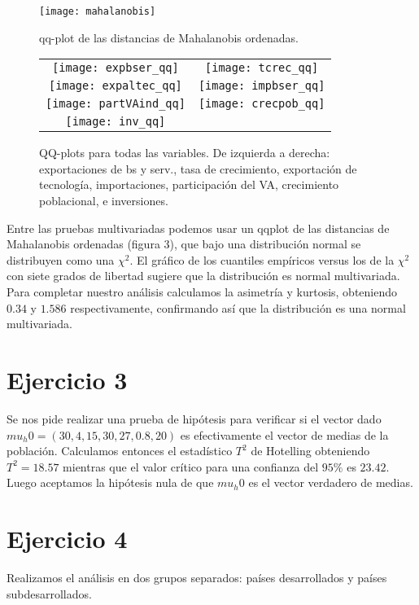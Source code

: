 \documentclass[a4paper,10pt]{article}
\begin{document}
\begin{figure}[ht]
\centering
\texttt{[image: mahalanobis]}
\caption{qq-plot de las distancias de Mahalanobis ordenadas.}
\end{figure}


\begin{figure}[ht]
\begin{tabular}{cc}
 \texttt{[image: expbser\_qq]} &   \texttt{[image: tcrec\_qq]} \\[6pt]
 \texttt{[image: expaltec\_qq]} &   \texttt{[image: impbser\_qq]} \\[6pt]
 \texttt{[image: partVAind\_qq]} &   \texttt{[image: crecpob\_qq]} \\[6pt]
 \texttt{[image: inv\_qq]}
\end{tabular}
\caption{QQ-plots para todas las variables. De izquierda a derecha: exportaciones de bs y serv., tasa de crecimiento, exportación de tecnología, 
importaciones, participación del VA, crecimiento poblacional, e inversiones.}
\end{figure}

Entre las pruebas multivariadas podemos usar un qqplot de las distancias de Mahalanobis ordenadas (figura 3), que bajo una distribución normal se 
distribuyen como una $\chi^2$. El gráfico de los cuantiles empíricos versus los de la $\chi^2$ con siete grados de libertad sugiere que la distribución es
normal multivariada.
Para completar nuestro análisis calculamos la asimetría y kurtosis, obteniendo $0.34$ y $1.586$ respectivamente, confirmando así que la distribución es
una normal multivariada.


\section{Ejercicio 3}
Se nos pide realizar una prueba de hipótesis para verificar si el vector dado $mu_h0 = (30, 4, 15, 30, 27, 0.8, 20)$ es efectivamente el vector de medias
de la población.
Calculamos entonces el estadístico $T^2$ de Hotelling obteniendo $T^2 = 18.57$ mientras que el valor crítico para una confianza del $95\%$ es $23.42$. Luego
aceptamos la hipótesis nula de que $mu_h0$ es el vector verdadero de medias.

\section{Ejercicio 4}

Realizamos el análisis en dos grupos separados: países desarrollados y países subdesarrollados.
\end{document}
